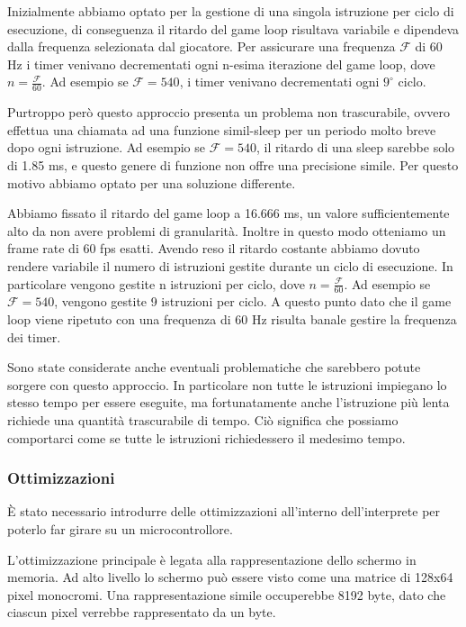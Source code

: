 \documentclass[a4paper]{article}
\begin{document}
Inizialmente abbiamo optato per la gestione di una singola istruzione per ciclo di esecuzione, di conseguenza il ritardo del game loop risultava variabile e dipendeva dalla frequenza selezionata dal giocatore. Per assicurare una frequenza $\mathcal{F}$ di 60 Hz i timer venivano decrementati ogni n-esima iterazione del game loop, dove $n = \frac{\mathcal{F}}{60}$. Ad esempio se $\mathcal{F} = 540$, i timer venivano decrementati ogni $9^{\circ}$ ciclo.

Purtroppo però questo approccio presenta un problema non trascurabile, ovvero effettua una chiamata ad una funzione simil-sleep per un periodo molto breve dopo ogni istruzione. Ad esempio se $\mathcal{F} = 540$, il ritardo di una sleep sarebbe solo di 1.85 ms, e questo genere di funzione non offre una precisione simile. Per questo motivo abbiamo optato per una soluzione differente.

Abbiamo fissato il ritardo del game loop a 16.666 ms, un valore sufficientemente alto da non avere problemi di granularità. Inoltre in questo modo otteniamo un frame rate di 60 fps esatti. Avendo reso il ritardo costante abbiamo dovuto rendere variabile il numero di istruzioni gestite durante un ciclo di esecuzione. In particolare vengono gestite n istruzioni per ciclo, dove $n = \frac{\mathcal{F}}{60}$. Ad esempio se $\mathcal{F} = 540$, vengono gestite 9 istruzioni per ciclo. A questo punto dato che il game loop viene ripetuto con una frequenza di 60 Hz risulta banale gestire la frequenza dei timer.

Sono state considerate anche eventuali problematiche che sarebbero potute sorgere con questo approccio. In particolare non tutte le istruzioni impiegano lo stesso tempo per essere eseguite, ma fortunatamente anche l'istruzione più lenta richiede una quantità trascurabile di tempo. Ciò significa che possiamo comportarci come se tutte le istruzioni richiedessero il medesimo tempo.

\subsubsection{Ottimizzazioni}

È stato necessario introdurre delle ottimizzazioni all'interno dell'interprete per poterlo far girare su un microcontrollore.

L'ottimizzazione principale è legata alla rappresentazione dello schermo in memoria. Ad alto livello lo schermo può essere visto come una matrice di 128x64 pixel monocromi. Una rappresentazione simile occuperebbe 8192 byte, dato che ciascun pixel verrebbe rappresentato da un byte.
\end{document}
